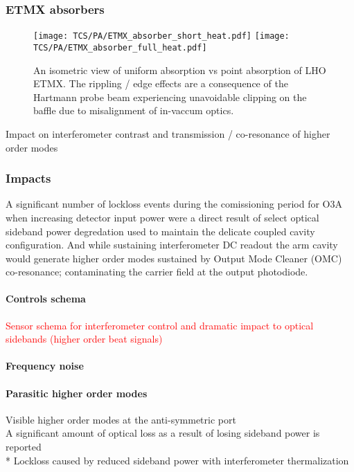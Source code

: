 \subsubsection{ETMX absorbers}
\begin{figure}[H]
  \centering
  \begin{subcaptiongroup}
	  \texttt{[image: TCS/PA/ETMX\_absorber\_short\_heat.pdf]}
	  \label{subfig:etmxpajustself}
	  \texttt{[image: TCS/PA/ETMX\_absorber\_full\_heat.pdf]}
	  \label{subfig:etmxpaselfplusabs}
  \end{subcaptiongroup}
  \captionsetup{subrefformat=parens}
  \hfill
  \caption{An isometric view of uniform absorption vs point absorption of LHO ETMX. The rippling / edge effects are a consequence of the Hartmann probe beam experiencing unavoidable clipping on the baffle due to misalignment of in-vaccum optics.}
  \label{fig:ETMXpabs}
\end{figure}

Impact on interferometer contrast and transmission / co-resonance of higher order modes

\subsubsection{Impacts}
A significant number of lockloss events during the comissioning period for O3A when increasing detector input power were a direct result of select optical sideband power degredation used to maintain the delicate coupled cavity configuration. And while sustaining interferometer DC readout the arm cavity would generate higher order modes sustained by Output Mode Cleaner (OMC) co-resonance; contaminating the carrier field at the output photodiode.

\paragraph{Controls schema}
\textcolor{red}{Sensor schema for interferometer control and dramatic impact to optical sidebands (higher order beat signals)}
\paragraph{Frequency noise}
\paragraph{Parasitic higher order modes}
Visible higher order modes at the anti-symmetric port \\
A significant amount of optical loss as a result of losing sideband power is reported \\
	* Lockloss caused by reduced sideband power with interferometer thermalization \\

